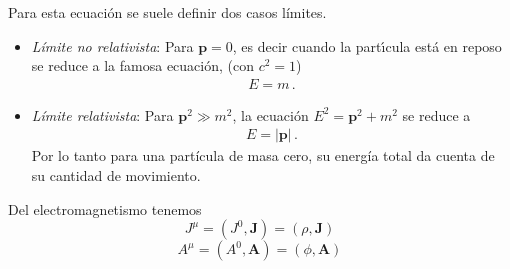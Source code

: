 \begin{frame}
Para esta ecuación se suele definir dos casos límites.
\begin{itemize}
\item \emph{Límite no relativista}: Para $\mathbf{p}=0$, es decir cuando la part\'\i cula est\'a en reposo se reduce a la famosa ecuaci\'on, (con $c^2=1$)
  \begin{align}
    E=m\,.
  \end{align}

\item \emph{Límite relativista}: Para $\mathbf{p}^2\gg m^2$, la ecuación $E^2=\mathbf{p}^2+m^2$ se reduce a
  \begin{align}
    E= |\mathbf{p}|\,.
  \end{align}
Por lo tanto para una partícula de masa cero, su energía total da cuenta de su cantidad de movimiento.
\end{itemize}

\end{frame}

\begin{frame}
Del electromagnetismo tenemos
\begin{equation}
  \label{eq:cv_jmu}
  J^\mu=(J^0,\mathbf{J})=(\rho,\mathbf{J})
\end{equation}
\begin{equation}
  \label{eq:cv_phia}
  A^\mu=(A^0,\mathbf{A})=(\phi,\mathbf{A})
\end{equation}
\end{frame}

